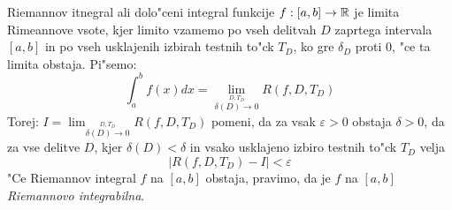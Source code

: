 Riemannov itnegral ali dolo"ceni integral funkcije $f: [a, b] \to \mathbb{R}$ je limita Rimeannove vsote, kjer limito vzamemo po vseh delitvah $D$ zaprtega intervala $[a, b]$ in po vseh usklajenih izbirah testnih to"ck $T_D$, ko gre $\delta_D$ proti 0, "ce ta limita obstaja. Pi"semo:
\begin{equation*}
\int_{a}^{b} f(x) dx = \lim_{\stackrel{D, T_D}{\delta(D) \to 0}} R(f, D, T_D)
\end{equation*}
Torej: $I = \lim_{\stackrel{D, T_D}{\delta(D) \to 0}} R(f, D, T_D)$ pomeni, da za vsak $\varepsilon > 0$ obstaja $\delta > 0$, da za vse delitve $D$, kjer $\delta(D) < \delta$ in vsako usklajeno izbiro testnih to"ck $T_D$ velja
\begin{equation*}
\left| R(f, D, T_D) - I \right| < \varepsilon
\end{equation*}
"Ce Riemannov integral $f$ na $[a, b]$ obstaja, pravimo, da je $f$ na $[a, b]$ \emph{Riemannovo integrabilna}.